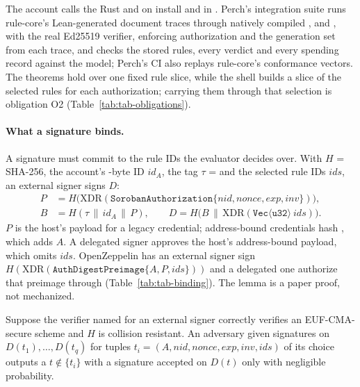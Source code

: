 The account calls the Rust  and  on install and
\allowbreak{} in . Perch's
integration suite runs rule-core's  Lean-generated document
traces through natively compiled ,  and
, with the real Ed25519 verifier, enforcing authorization and
the generation set from each trace, and checks the stored rules, every verdict
and every spending record against the model; Perch's CI also replays rule-core's
conformance vectors. The theorems hold over one fixed rule slice, while the shell
builds a slice of the selected rules for each authorization; carrying them
through that selection is obligation O2 (Table~\ref{tab:tab-obligations}).




\paragraph{What a signature binds.} A signature must commit to the rule IDs the
evaluator decides over. With $H$ = SHA-256, the account's
-byte ID $\mathit{id}_A$, the tag $\tau$ =
 and the selected rule IDs $\mathit{ids}$, an external
signer signs $D$:
\begin{align*}
  P &= H\bigl(\mathrm{XDR}(\mathtt{SorobanAuthorization}\{\mathit{nid}, \mathit{nonce}, \mathit{exp}, \mathit{inv}\})\bigr),\\
  B &= H(\tau \,\|\, \mathit{id}_A \,\|\, P), \qquad
  D = H\bigl(B \,\|\, \mathrm{XDR}(\mathtt{Vec}\langle\mathtt{u32}\rangle\ \mathit{ids})\bigr).
\end{align*}
$P$ is the host's payload for a legacy  credential; address-bound
credentials hash , which adds $A$. A
delegated signer approves the host's address-bound payload, which omits
$\mathit{ids}$. OpenZeppelin  has an external signer sign
$H(\mathrm{XDR}(\mathtt{AuthDigestPreimage}\{A, P, \mathit{ids}\}))$ and a
delegated one authorize that preimage through 
(Table~\ref{tab:tab-binding}). The lemma is a paper proof, not mechanized.

\begin{lemma}[binding]\label{lem:binding}
Suppose the verifier named for an external signer correctly verifies an
EUF-CMA-secure scheme and $H$ is collision resistant. An adversary given
signatures on $D(t_1),\dots,D(t_q)$ for tuples
$t_i = (A, \mathit{nid}, \mathit{nonce}, \mathit{exp}, \mathit{inv}, \mathit{ids})$
of its choice outputs a $t \notin \{t_i\}$ with a signature accepted on $D(t)$
only with negligible probability.
\end{lemma}

